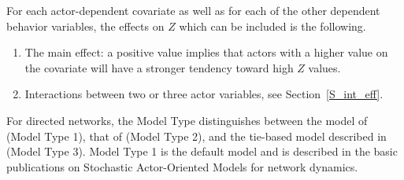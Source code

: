 \documentclass[a4paper,fleqn]{article}
\newcommand{\+}{\, + \,}
\newcommand{\SI}{{\sf SIENA }}
\newcommand{\si}{{\sf SIENA}}
\begin{document}
{For each actor-dependent covariate as well as for each of the other
dependent behavior variables,
the effects on $Z$ which can be included is the following.
\begin{enumerate}
\item The main effect: a positive value implies that actors with a
      higher value on the covariate will have a stronger tendency
      toward high $Z$ values.

\item Interactions between two or three actor variables, see
      Section~\ref{S_int_eff}.
\end{enumerate}

\iffalse
For directed networks, the Model Type distinguishes between
the model of \citet{Snijders01} (Model Type 1),
that of \citet{Snijders03} (Model Type 2),
and the tie-based model described in \citet{Snijders06} (Model Type 3).
Model Type 1 is the default model and is
described in the basic publications on Stochastic Actor-Oriented
Models for network dynamics.

}
\end{document}
